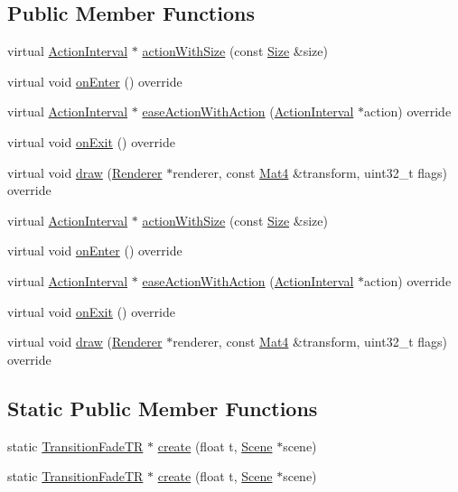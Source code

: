 \subsection*{Public Member Functions}
\begin{DoxyCompactItemize}
\item 
virtual \hyperlink{classActionInterval}{Action\+Interval} $\ast$ \hyperlink{classTransitionFadeTR_a371a39553335050a845c6743d20aac00}{action\+With\+Size} (const \hyperlink{classSize}{Size} \&size)
\item 
virtual void \hyperlink{classTransitionFadeTR_aff4ebcd832386860100daad82ad48bc2}{on\+Enter} () override
\item 
virtual \hyperlink{classActionInterval}{Action\+Interval} $\ast$ \hyperlink{classTransitionFadeTR_aa802204cdcae09fa5acacfee75200a11}{ease\+Action\+With\+Action} (\hyperlink{classActionInterval}{Action\+Interval} $\ast$action) override
\item 
virtual void \hyperlink{classTransitionFadeTR_a62a984bd87eb2090da0e542e5ce91cce}{on\+Exit} () override
\item 
virtual void \hyperlink{classTransitionFadeTR_ae96994b31bd3e6c6bc93b630b5d5edd1}{draw} (\hyperlink{classRenderer}{Renderer} $\ast$renderer, const \hyperlink{classMat4}{Mat4} \&transform, uint32\+\_\+t flags) override
\item 
virtual \hyperlink{classActionInterval}{Action\+Interval} $\ast$ \hyperlink{classTransitionFadeTR_a371728d4ffa70783ea61f4f9a06afb23}{action\+With\+Size} (const \hyperlink{classSize}{Size} \&size)
\item 
virtual void \hyperlink{classTransitionFadeTR_a0233b4bea549912854460a1a969f8bb4}{on\+Enter} () override
\item 
virtual \hyperlink{classActionInterval}{Action\+Interval} $\ast$ \hyperlink{classTransitionFadeTR_a044517e402fd76f102f143c8e00dc852}{ease\+Action\+With\+Action} (\hyperlink{classActionInterval}{Action\+Interval} $\ast$action) override
\item 
virtual void \hyperlink{classTransitionFadeTR_a9460b2272ddd276f68727429474b6862}{on\+Exit} () override
\item 
virtual void \hyperlink{classTransitionFadeTR_a2bc9e0112e0242feb4279c2f951cb8e3}{draw} (\hyperlink{classRenderer}{Renderer} $\ast$renderer, const \hyperlink{classMat4}{Mat4} \&transform, uint32\+\_\+t flags) override
\end{DoxyCompactItemize}
\subsection*{Static Public Member Functions}
\begin{DoxyCompactItemize}
\item 
static \hyperlink{classTransitionFadeTR}{Transition\+Fade\+TR} $\ast$ \hyperlink{classTransitionFadeTR_a3439906e5b3c616eec3f7821371e42b5}{create} (float t, \hyperlink{classScene}{Scene} $\ast$scene)
\item 
static \hyperlink{classTransitionFadeTR}{Transition\+Fade\+TR} $\ast$ \hyperlink{classTransitionFadeTR_ad82cca6854361bd5f21bf47d8bf182b0}{create} (float t, \hyperlink{classScene}{Scene} $\ast$scene)
\end{DoxyCompactItemize}
